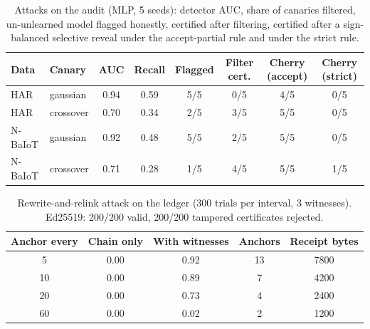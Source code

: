 \begin{table}[h]
\centering
\caption{Attacks on the audit (MLP, 5 seeds): detector AUC, share of canaries filtered, un-unlearned model flagged honestly, certified after filtering, certified after a sign-balanced selective reveal under the accept-partial rule and under the strict rule.}\label{tab:s_att}
\footnotesize
\setlength{\tabcolsep}{3pt}
\begin{tabular}{@{}llcccccc@{}}
\toprule
Data & Canary & AUC & Recall & Flagged & Filter cert. & Cherry (accept) & Cherry (strict) \\
\midrule
HAR & gaussian & 0.94 & 0.59 & 5/5 & 0/5 & 4/5 & 0/5 \\
HAR & crossover & 0.70 & 0.34 & 2/5 & 3/5 & 5/5 & 0/5 \\
N-BaIoT & gaussian & 0.92 & 0.48 & 5/5 & 2/5 & 5/5 & 0/5 \\
N-BaIoT & crossover & 0.71 & 0.28 & 1/5 & 4/5 & 5/5 & 1/5 \\
\bottomrule
\end{tabular}
\end{table}

\begin{table}[h]
\centering
\caption{Rewrite-and-relink attack on the ledger (300 trials per interval, 3 witnesses). Ed25519: 200/200 valid, 200/200 tampered certificates rejected.}\label{tab:s_anchor}
\footnotesize
\setlength{\tabcolsep}{3pt}
\begin{tabular}{@{}ccccc@{}}
\toprule
Anchor every & Chain only & With witnesses & Anchors & Receipt bytes \\
\midrule
5 & 0.00 & 0.92 & 13 & 7800 \\
10 & 0.00 & 0.89 & 7 & 4200 \\
20 & 0.00 & 0.73 & 4 & 2400 \\
60 & 0.00 & 0.02 & 2 & 1200 \\
\bottomrule
\end{tabular}
\end{table}


